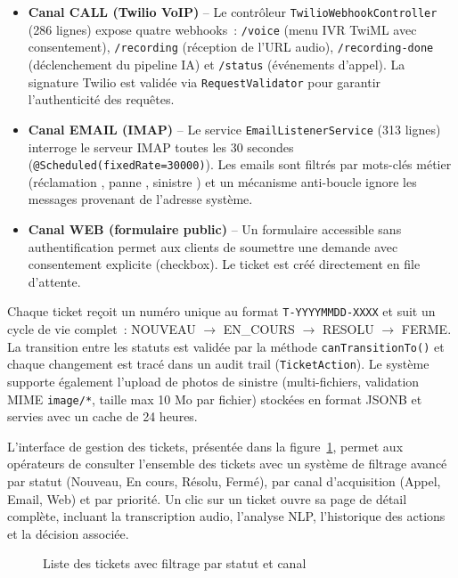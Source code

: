\begin{itemize}
    \item \textbf{Canal CALL (Twilio VoIP)} -- Le contr\^{o}leur \texttt{TwilioWebhookController} (286 lignes) expose quatre webhooks~: \texttt{/voice} (menu IVR TwiML avec consentement), \texttt{/recording} (r\'{e}ception de l'URL audio), \texttt{/recording-done} (d\'{e}clenchement du pipeline IA) et \texttt{/status} (\'{e}v\'{e}nements d'appel). La signature Twilio est valid\'{e}e via \texttt{RequestValidator} pour garantir l'authenticit\'{e} des requ\^{e}tes.
    \item \textbf{Canal EMAIL (IMAP)} -- Le service \texttt{EmailListenerService} (313 lignes) interroge le serveur IMAP toutes les 30 secondes (\texttt{@Scheduled(fixedRate=30000)}). Les emails sont filtr\'{e}s par mots-cl\'{e}s m\'{e}tier (\og r\'{e}clamation \fg, \og panne \fg, \og sinistre \fg) et un m\'{e}canisme anti-boucle ignore les messages provenant de l'adresse syst\`{e}me.
    \item \textbf{Canal WEB (formulaire public)} -- Un formulaire accessible sans authentification permet aux clients de soumettre une demande avec consentement explicite (checkbox). Le ticket est cr\'{e}\'{e} directement en file d'attente.
\end{itemize}

Chaque ticket re\c{c}oit un num\'{e}ro unique au format \texttt{T-YYYYMMDD-XXXX} et suit un cycle de vie complet~: NOUVEAU $\rightarrow$ EN\_COURS $\rightarrow$ RESOLU $\rightarrow$ FERME. La transition entre les statuts est valid\'{e}e par la m\'{e}thode \texttt{canTransitionTo()} et chaque changement est trac\'{e} dans un audit trail (\texttt{TicketAction}). Le syst\`{e}me supporte \'{e}galement l'upload de photos de sinistre (multi-fichiers, validation MIME \texttt{image/*}, taille max 10 Mo par fichier) stock\'{e}es en format JSONB et servies avec un cache de 24 heures.

L'interface de gestion des tickets, pr\'{e}sent\'{e}e dans la figure~\ref{fig:tickets}, permet aux op\'{e}rateurs de consulter l'ensemble des tickets avec un syst\`{e}me de filtrage avanc\'{e} par statut (Nouveau, En cours, R\'{e}solu, Ferm\'{e}), par canal d'acquisition (Appel, Email, Web) et par priorit\'{e}. Un clic sur un ticket ouvre sa page de d\'{e}tail compl\`{e}te, incluant la transcription audio, l'analyse NLP, l'historique des actions et la d\'{e}cision associ\'{e}e.

\begin{figure}[H]
    \centering
    \caption{Liste des tickets avec filtrage par statut et canal}
    \label{fig:tickets}
\end{figure}

